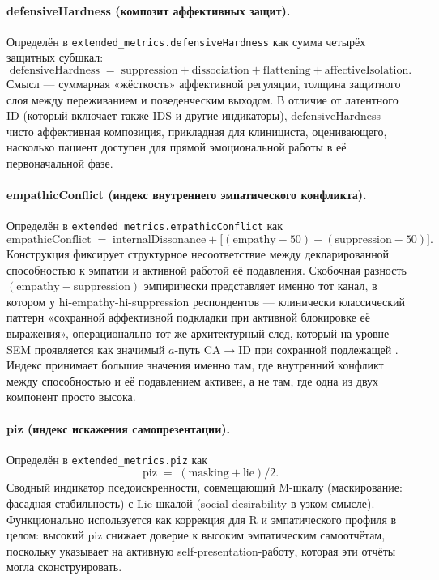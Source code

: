 \paragraph{defensiveHardness (композит аффективных защит).} Определён в \texttt{extended\_metrics.defensiveHardness} как сумма четырёх защитных субшкал:
\[
\text{defensiveHardness} \;=\; \text{suppression} + \text{dissociation} + \text{flattening} + \text{affectiveIsolation}.
\]
Смысл --- суммарная «жёсткость» аффективной регуляции, толщина защитного слоя между переживанием и поведенческим выходом. В отличие от латентного ID (который включает также IDS и другие индикаторы), defensiveHardness --- чисто аффективная композиция, прикладная для клинициста, оценивающего, насколько пациент доступен для прямой эмоциональной работы в её первоначальной фазе.

\paragraph{empathicConflict (индекс внутреннего эмпатического конфликта).} Определён в \texttt{extended\_metrics.empathicConflict} как
\[
\text{empathicConflict} \;=\; \text{internalDissonance} + \bigl[(\text{empathy} - 50) - (\text{suppression} - 50)\bigr].
\]
Конструкция фиксирует структурное несоответствие между декларированной способностью к эмпатии и активной работой её подавления. Скобочная разность $(\text{empathy} - \text{suppression})$ эмпирически представляет именно тот канал, в котором у hi-empathy-hi-suppression респондентов --- клинически классический паттерн «сохранной аффективной подкладки при активной блокировке её выражения», операционально тот же архитектурный след, который на уровне SEM проявляется как значимый $a$-путь CA$\to$ID при сохранной подлежащей \EAF{}. Индекс принимает большие значения именно там, где внутренний конфликт между способностью и её подавлением активен, а не там, где одна из двух компонент просто высока.

\paragraph{piz (индекс искажения самопрезентации).} Определён в \texttt{extended\_metrics.piz} как
\[
\text{piz} \;=\; (\text{masking} + \text{lie}) / 2.
\]
Сводный индикатор пседоискренности, совмещающий M-шкалу (маскирование: фасадная стабильность) с Lie-шкалой (social desirability в узком смысле). Функционально используется как коррекция для R и эмпатического профиля в целом: высокий piz снижает доверие к высоким эмпатическим самоотчётам, поскольку указывает на активную self-presentation-работу, которая эти отчёты могла сконструировать.

